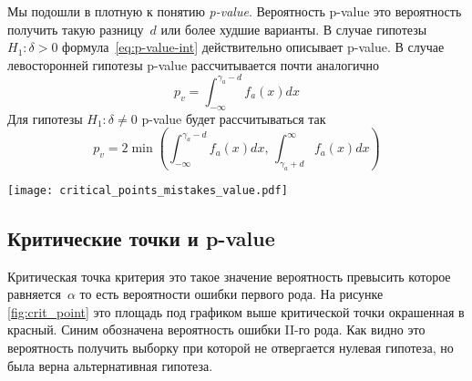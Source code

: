 \documentclass[../handbook.tex]{subfiles}
\begin{document}
% 
% 

Мы подошли в плотную к понятию \emph{p-value}. Вероятность p-value это вероятность получить такую разницу~$d$ или более худшие варианты. В случае гипотезы $H_1: \delta > 0$ формула~\eqref{eq:p-value-int} действительно описывает p-value. В случае левосторонней гипотезы p-value рассчитывается почти аналогично
\begin{equation*}
    p_v = \int_{-\infty}^{\gamma_a - d} f_a(x)dx
\end{equation*}
Для гипотезы $H_1: \delta \ne 0$ p-value будет рассчитываться так
\begin{equation}
    p_{v} = 2 \min\left(
        \int_{-\infty}^{\gamma_a - d} f_a(x)dx ,\, 
        \int_{\gamma_a + d}^\infty f_a(x) dx
    \right)
    \label{eq:p-value-double-side}
\end{equation}

\begin{marginfigure}
    \texttt{[image: critical\_points\_mistakes\_value.pdf]}
    \label{fig:crit_point}
\end{marginfigure}

\subsection{Критические точки и p-value}
Критическая точка критерия это такое значение вероятность превысить которое
равняется~$\alpha$ то есть вероятности ошибки первого рода. На рисунке
\ref{fig:crit_point} это площадь под графиком выше критической точки окрашенная
в красный. Синим обозначена вероятность ошибки II-го рода. Как видно это
вероятность получить выборку при которой не отвергается нулевая гипотеза, но
была верна альтернативная гипотеза.
\end{document}
